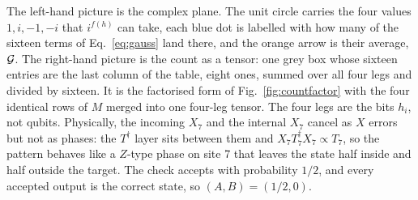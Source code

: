 \begin{center}
\qquad
{}
\end{center}
The left-hand picture is the complex plane. The unit circle carries the four values $1,i,-1,-i$ that $i^{f(h)}$ can take, each blue dot is labelled with how many of the sixteen terms of Eq.~\eqref{eq:gauss} land there, and the orange arrow is their average, ${\cal G}$. The right-hand picture is the count as a tensor: one grey box whose sixteen entries are the last column of the table, eight ones, summed over all four legs and divided by sixteen. It is the factorised form of Fig.~\ref{fig:countfactor} with the four identical rows of $M$ merged into one four-leg tensor. The four legs are the bits $h_i$, not qubits. Physically, the incoming $X_7$ and the internal $X_7$ cancel as $X$ errors but not as phases: the $T^\dagger$ layer sits between them and $X_7T_7^\dagger X_7\propto T_7$, so the pattern behaves like a $Z$-type phase on site 7 that leaves the state half inside and half outside the target. The check accepts with probability $1/2$, and every accepted output is the correct state, so $(A,B)=(1/2,0)$.


